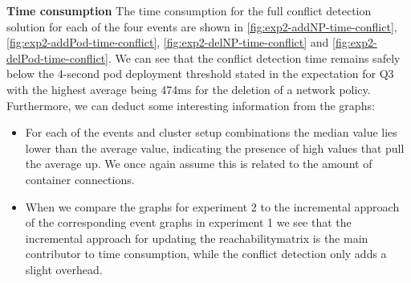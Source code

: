 \textbf{Time consumption}
\newline The time consumption for the full conflict detection solution for each of the four events are shown in \autoref{fig:exp2-addNP-time-conflict}, \autoref{fig:exp2-addPod-time-conflict}, \autoref{fig:exp2-delNP-time-conflict} and \autoref{fig:exp2-delPod-time-conflict}.  We can see that the conflict detection time remains safely below the 4-second pod deployment threshold stated in the expectation for Q3 with the highest average being 474ms for the deletion of a network policy. Furthermore, we can deduct some interesting information from the graphs:
\begin{itemize}
    \item For each of the events and cluster setup combinations the median value lies lower than the average value, indicating the presence of high values that pull the average up. We once again assume this is related to the amount of container connections.
    \item When we compare the graphs for experiment 2 to the incremental approach of the corresponding event graphs in experiment 1 we see that the incremental approach for updating the reachabilitymatrix is the main contributor to time consumption, while the conflict detection only adds a slight overhead.
\end{itemize}

